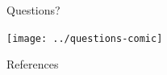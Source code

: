 \documentclass[xcolor=x11names,compress]{beamer}
\renewcommand{\(}{\begin{columns}}
\renewcommand{\)}{\end{columns}}
\newcommand{\<}[1]{\begin{column}{#1}}
\renewcommand{\>}{\end{column}}
\begin{document}
\begin{frame}[fragile]{Questions?}

    \begin{center}
    \texttt{[image: ../questions-comic]}  
    \end{center}
  
\end{frame}

\begin{frame}[allowframebreaks]{References}
	
	
\end{frame}
\end{document}
